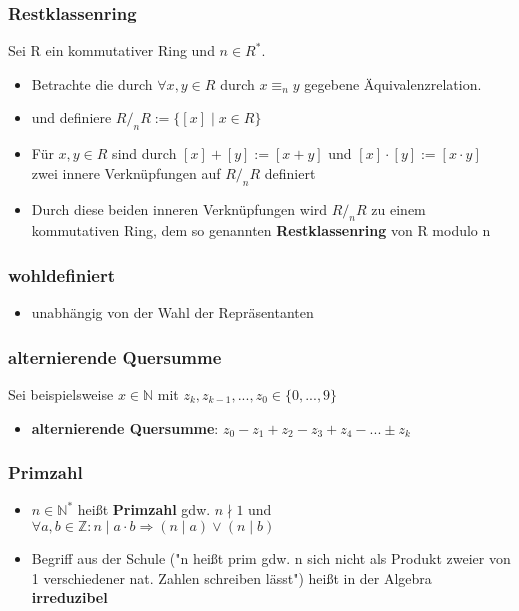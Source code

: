 \documentclass[titlepage]{article}
\newcommand{\N}{\mathbb{N}}
\newcommand{\1}{\mathbb{1}}
\newcommand{\0}{\mathbb{0}}
\newcommand{\Z}{\mathbb{Z}}
\begin{document}
				\subsubsection{Restklassenring}
					Sei R ein kommutativer Ring und $n\in R^*$.
					\begin{itemize}
						\item Betrachte die durch $\forall x,y\in R$ durch $x\equiv_ny$ gegebene Äquivalenzrelation.
						\item und definiere $R/_{n}R:=\{[x]\mid x\in R\}$\\
						\item Für $x,y\in R$ sind durch $[x]+[y]:=[x+y]$ und $[x]\cdot[y]:=[x\cdot y]$ zwei innere Verknüpfungen auf $R/_nR$ definiert
						\item Durch diese beiden inneren Verknüpfungen wird $R/_nR$ zu einem kommutativen Ring, dem so genannten \textbf{Restklassenring} von R modulo n\\
					\end{itemize}
				\subsubsection{wohldefiniert}
					\begin{itemize}
						\item unabhängig von der Wahl der Repräsentanten
					\end{itemize}
				\subsubsection{alternierende Quersumme}
					Sei beispielsweise $x\in\N$ mit $z_k,z_{k-1},...,z_0\in\{0,...,9\}$
					\begin{itemize}
						\item \textbf{alternierende Quersumme}: $z_0-z_1+z_2-z_3+z_4-...\pm z_k$
					\end{itemize}
				\subsubsection{Primzahl}
					\begin{itemize}
						\item $n\in\N^*$ heißt \textbf{Primzahl} gdw. $n\nmid1$ und $\forall a,b\in\Z:n\mid a\cdot b\Rightarrow(n\mid a)\vee(n\mid b)$
						\item Begriff aus der Schule ("n heißt prim gdw. n sich nicht als Produkt zweier von 1 verschiedener nat. Zahlen schreiben lässt") heißt in der Algebra \textbf{irreduzibel}
					\end{itemize}
\end{document}
